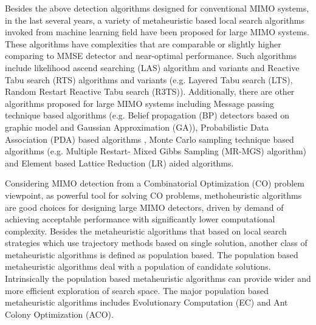 Besides the above detection algorithms designed for conventional MIMO systems, in the last several years, a variety of metaheuristic based local search algorithms invoked from machine learning field\cite{chockalingam2010low} have been proposed for large MIMO systems. These algorithms have complexities that are comparable or slightly higher comparing to MMSE detector and near-optimal performance. Such algorithms include likelihood ascend searching (LAS) algorithm and variants\cite{vardhan2008low}\cite{cerato2009hardware}\cite{li2010multiple} %
and Reactive Tabu search (RTS) algorithms and variants
(e.g. Layered Tabu search (LTS)\cite{srinidhi2011layered}, Random Restart Reactive Tabu search (R3TS)\cite{datta2010random}). Additionally, there are other algorithms proposed for large MIMO systems including Message passing technique based algorithms (e.g. Belief propagation (BP) detectors based on graphic model and Gaussian Approximation (GA)\cite{som2011low}\cite{som2010improved}\cite{narasimhan2014channel}\cite{goldberger2011mimo}), Probabilistic Data Association (PDA) based algorithms \cite{mohammed2009low}, Monte Carlo sampling technique based algorithms (e.g. Multiple Restart- Mixed Gibbs Sampling (MR-MGS) algorithm\cite{datta2013novel}) and Element based Lattice Reduction (LR) aided algorithms\cite{zhou2013element}.

 Considering MIMO detection from a Combinatorial Optimization (CO) problem viewpoint, as powerful tool for solving CO problems, methoheuristic algorithms\cite{blum2003metaheuristics} are good choices for designing large MIMO detectors, driven by demand of achieving acceptable performance with significantly lower computational complexity. Besides the metaheuristic algorithms that based on local search strategies which use trajectory methods based on single solution, another class of metaheuristic algorithms is defined as population based. The population based metaheuristic algorithms deal with a population of candidate solutions. Intrinsically the population based metaheuristic algorithms can provide wider and more efficient exploration of search space. The major population based metaheuristic algorithms includes Evolutionary Computation (EC) and Ant Colony Optimization (ACO). 
 
